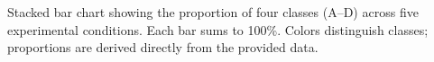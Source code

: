 \caption{Stacked bar chart showing the proportion of four classes (A--D) across five experimental conditions. Each bar sums to 100\%. Colors distinguish classes; proportions are derived directly from the provided data.}
